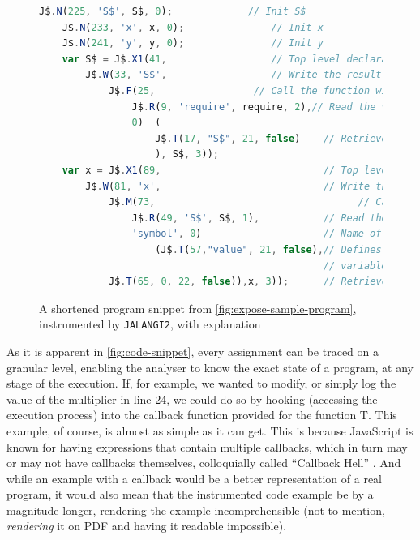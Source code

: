 \begin{figure}[ht]

 \lstset{basicstyle=\footnotesize}
    \begin{lstlisting}[language=JavaScript, gobble=4]
    J$.N(225, 'S$', S$, 0);             // Init S$
    J$.N(233, 'x', x, 0);               // Init x
    J$.N(241, 'y', y, 0);               // Init y
    var S$ = J$.X1(41,                  // Top level declaration
        J$.W(33, 'S$',                  // Write the result of the following:
            J$.F(25,                 // Call the function with the follwing parameter:
                J$.R(9, 'require', require, 2),// Read the value of "require"
                0)  (
                    J$.T(17, "S$", 21, false)    // Retrieve the value of the S$ object
                    ), S$, 3));
    var x = J$.X1(89,                            // Top level declaration
        J$.W(81, 'x',                            // Write the result of the following:
            J$.M(73,                                   // Call the function of:
                J$.R(49, 'S$', S$, 1),           // Read the value of the expression S$
                'symbol', 0)                     // Name of the called function
                    (J$.T(57,"value", 21, false),// Defines the value of the 
                                                 // variable as literal
            J$.T(65, 0, 22, false)),x, 3));      // Retrieve the value "0"


    \end{lstlisting}
    \caption[Instrumented code snippet]{A shortened program snippet from \autoref{fig:expose-sample-program}, instrumented by \texttt{JALANGI2}, with explanation}
    \label{fig:code-snippet}
\end{figure}
\newpage
As it is apparent in \autoref{fig:code-snippet}, every assignment can be traced on a granular level, enabling the analyser to know the exact state of a program, at any stage of the execution. If, for example, we wanted to modify, or simply log the value of the multiplier in line 24, we could do so by hooking (accessing the execution process) into the callback function provided for the function T.
This example, of course, is almost as simple as it can get. This is because JavaScript is known for having expressions that contain multiple callbacks, which in turn may or may not have callbacks themselves, colloquially called “Callback Hell” \cite{max_ogden_callback_2019}. And while an example with a callback would be a better representation of a real program, it would also mean that the instrumented code example be by a magnitude longer, rendering the example incomprehensible (not to mention, \textit{rendering} it on PDF and having it readable impossible). \\


